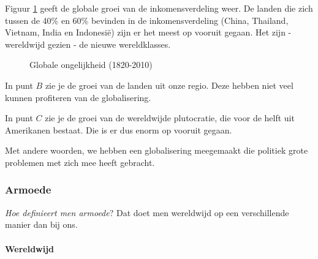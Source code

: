 Figuur \ref{fig:h4globgroei} geeft de globale groei van de inkomensverdeling weer. De landen die zich tussen de 40\% en 60\% bevinden in de inkomensverdeling (China, Thailand, Vietnam, India en Indonesi\"e) zijn er het meest op vooruit gegaan. Het zijn - wereldwijd gezien - de nieuwe wereldklasses.

\begin{figure}[H]
\small\centering\captionsetup{justification=centering,margin=2cm}
\caption{Globale ongelijkheid (1820-2010)}
\label{fig:h4globgroei}
\end{figure}

In punt $B$ zie je de groei van de landen uit onze regio. Deze hebben niet veel kunnen profiteren van de globalisering.
\par In punt $C$ zie je de groei van de wereldwijde plutocratie, die voor de helft uit Amerikanen bestaat. Die is er dus enorm op vooruit gegaan.
\par Met andere woorden, we hebben een globalisering meegemaakt die politiek grote problemen met zich mee heeft gebracht.

\subsubsection{Armoede}

\par \textit{Hoe definieert men armoede}? Dat doet men wereldwijd op een verschillende manier dan bij ons.

\paragraph{Wereldwijd}

